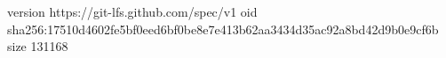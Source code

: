 version https://git-lfs.github.com/spec/v1
oid sha256:17510d4602fe5bf0eed6bf0be8e7e413b62aa3434d35ac92a8bd42d9b0e9cf6b
size 131168

